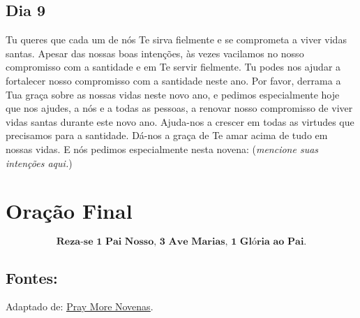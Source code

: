 \documentclass[a4paper,14pt]{extarticle} \usepackage[utf8]{inputenc}
\begin{document}
\subsection{Dia 9}

Tu queres que cada um de nós Te sirva fielmente e se comprometa a viver vidas santas. Apesar das nossas boas intenções, às vezes vacilamos no nosso compromisso com a santidade e em Te servir fielmente. Tu podes nos ajudar a fortalecer nosso compromisso com a santidade neste ano.
Por favor, derrama a Tua graça sobre as nossas vidas neste novo ano, e pedimos especialmente hoje que nos ajudes, a nós e a todas as pessoas, a renovar nosso compromisso de viver vidas santas durante este novo ano.
Ajuda-nos a crescer em todas as virtudes que precisamos para a santidade. Dá-nos a graça de Te amar acima de tudo em nossas vidas.
E nós pedimos especialmente nesta novena: (\textit{mencione suas intenções aqui.})

\section{Oração Final} \label{oracao-final}

\[
\textbf{Reza-se 1 Pai Nosso, 3 Ave Marias, 1 Glória ao Pai.}
\]

\vfill

\begin{center}
\subsection*{Fontes:}
Adaptado de: \underline{\href{https://www.praymorenovenas.com/new-year-novena}{Pray More Novenas}}.
\end{center}
\end{document}
